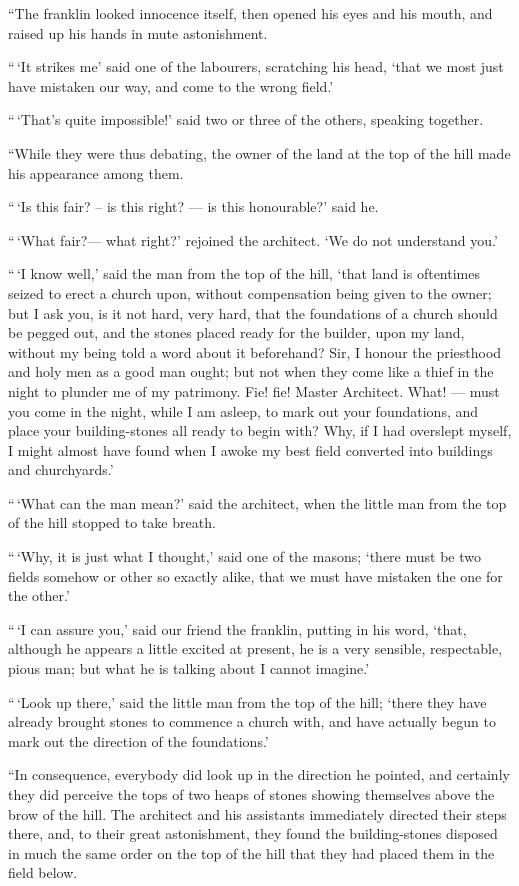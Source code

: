 \documentclass[
  12pt,
  a5paper,
  twoside]{book}
\begin{document}
``The franklin looked innocence itself, then opened his eyes and his
mouth, and raised up his hands in mute astonishment.

``\,`It strikes me' said one of the labourers, scratching his head,
`that we most just have mistaken our way, and come to the wrong field.'

``\,`That's quite impossible!' said two or three of the others, speaking
together.

``While they were thus debating, the owner of the land at the top of the
hill made his appearance among them.

``\,`Is this fair? -- is this right? --- is this honourable?' said he.

``\,`What fair?--- what right?' rejoined the architect. `We do not
understand you.'

``\,`I know well,' said the man from the top of the hill, `that land is
oftentimes seized to erect a church upon, without compensation being
given to the owner; but I ask you, is it not hard, very hard, that the
foundations of a church should be pegged out, and the stones placed
ready for the builder, upon my land, without my being told a word about
it beforehand? Sir, I honour the priesthood and holy men as a good man
ought; but not when they come like a thief in the night to plunder me of
my patrimony. Fie! fie! Master Architect. What! --- must you come in the
night, while I am asleep, to mark out your foundations, and place your
building-stones all ready to begin with? Why, if I had overslept myself,
I might almost have found when I awoke my best field converted into
buildings and churchyards.'

``\,`What can the man mean?' said the architect, when the little man
from the top of the hill stopped to take breath.

``\,`Why, it is just what I thought,' said one of the masons; `there
must be two fields somehow or other so exactly alike, that we must have
mistaken the one for the other.'

``\,`I can assure you,' said our friend the franklin, putting in his
word, `that, although he appears a little excited at present, he is a
very sensible, respectable, pious man; but what he is talking about I
cannot imagine.'

``\,`Look up there,' said the little man from the top of the hill;
`there they have already brought stones to commence a church with, and
have actually begun to mark out the direction of the foundations.'

``In consequence, everybody did look up in the direction he pointed, and
certainly they did perceive the tops of two heaps of stones showing
themselves above the brow of the hill. The architect and his assistants
immediately directed their steps there, and, to their great
astonishment, they found the building-stones disposed in much the same
order on the top of the hill that they had placed them in the field
below.
\end{document}
